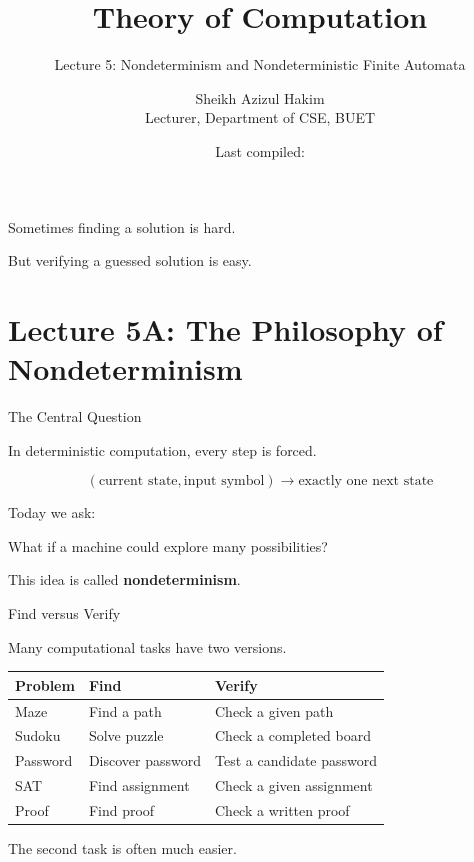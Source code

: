 \documentclass[10pt,aspectratio=169]{beamer}
\title{Theory of Computation}
\subtitle{Lecture 5: Nondeterminism and Nondeterministic Finite Automata}
\author{Sheikh Azizul Hakim\\Lecturer, Department of CSE, BUET}
\date{Last compiled: \LastCompiled}
\begin{document}
\maketitle

\begin{frame}[standout]
Sometimes finding a solution is hard.

But verifying a guessed solution is easy.
\end{frame}

\section{Lecture 5A: The Philosophy of Nondeterminism}

\begin{frame}{The Central Question}

In deterministic computation, every step is forced.

\[
(\text{current state},\text{input symbol})
\longrightarrow
\text{exactly one next state}
\]

\vspace{1em}

Today we ask:

\begin{center}
What if a machine could explore many possibilities?
\end{center}

\pause

This idea is called \textbf{nondeterminism}.

\end{frame}

\begin{frame}{Find versus Verify}

Many computational tasks have two versions.

\vspace{0.5em}

\begin{center}
\begin{tabular}{lll}
\toprule
\textbf{Problem} & \textbf{Find} & \textbf{Verify} \\
\midrule
Maze & Find a path & Check a given path \\
Sudoku & Solve puzzle & Check a completed board \\
Password & Discover password & Test a candidate password \\
SAT & Find assignment & Check a given assignment \\
Proof & Find proof & Check a written proof \\
\bottomrule
\end{tabular}
\end{center}

\vspace{0.7em}

\pause
The second task is often much easier.

\end{frame}
\end{document}
